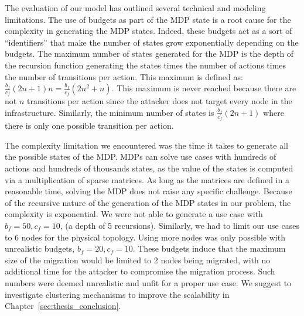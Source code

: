 \label{sec:mdp-discussion}
The evaluation of our model has outlined several technical and modeling limitations.
The use of budgets as part of the MDP state is a root cause for the complexity in generating the MDP states. Indeed, these budgets act as a sort of ``identifiers'' that make the number of states grow exponentially depending on the budgets. The maximum number of states generated for the MDP is the depth of the recursion function generating the states times the number of actions times the number of transitions per action. This maximum is defined as: $\frac{b_f}{c_f}(2n+1)n = \frac{b_f}{c_f}(2n^2+n)$. This maximum is never reached because there are not $n$ transitions per action since the attacker does not target every node in the infrastructure. Similarly, the minimum number of states is $\frac{b_f}{c_f}(2n+1)$ where there is only one possible transition per action. 

The complexity limitation we encountered was the time it takes to generate all the possible states of the MDP. MDPs can solve use cases with hundreds of actions and hundreds of thousands states, as the value of the states is computed via a multiplication of sparse matrices. As long as the matrices are defined in a reasonable time, solving the MDP does not raise any specific challenge.
Because of the recursive nature of the generation of the MDP states in our problem, the complexity is exponential.
We were not able to generate a use case with $b_f = 50, c_f = 10$, (\ie a depth of 5 recursions).
Similarly, we had to limit our use cases to 6 nodes for the physical topology. Using more nodes was only possible with unrealistic budgets, \eg $b_f = 20, c_f=10$. These budgets induce that the maximum size of the migration would be limited to 2 nodes being migrated, with no additional time for the attacker to compromise the migration process. Such numbers were deemed unrealistic and unfit for a proper use case. We suggest to investigate clustering mechanisms to improve the scalability in Chapter~\ref{sec:thesis_conclusion}.

